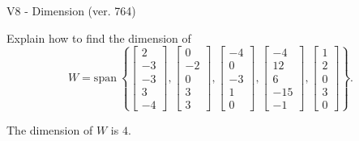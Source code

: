 \begin{exercise}
  \begin{exerciseTitle}V8 - Dimension (ver. 764)\end{exerciseTitle}
  \begin{exerciseStatement}
    Explain how to find the dimension of 
\[W=\mathrm{span}\ \left\{\left[\begin{array}{r}
2 \\
-3 \\
-3 \\
3 \\
-4
\end{array}\right] , \left[\begin{array}{r}
0 \\
-2 \\
0 \\
3 \\
3
\end{array}\right] , \left[\begin{array}{r}
-4 \\
0 \\
-3 \\
1 \\
0
\end{array}\right] , \left[\begin{array}{r}
-4 \\
12 \\
6 \\
-15 \\
-1
\end{array}\right] , \left[\begin{array}{r}
1 \\
2 \\
0 \\
3 \\
0
\end{array}\right]\right\}.\]



  \end{exerciseStatement}
  \begin{exerciseAnswer}
   The dimension of \(W\) is  \(4\).
  


  \end{exerciseAnswer}
\end{exercise}
